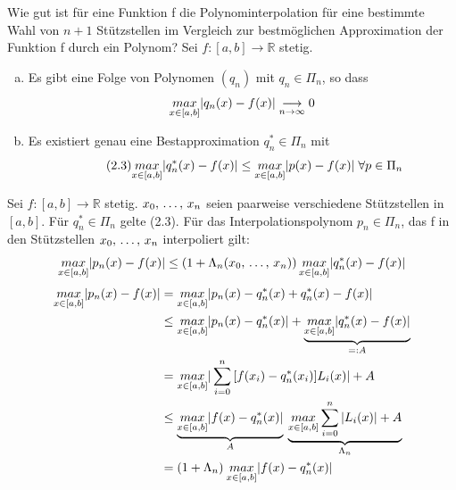 Wie gut ist für eine Funktion f die Polynominterpolation für eine bestimmte Wahl
von $n + 1$ Stützstellen im Vergleich zur bestmöglichen Approximation der Funktion f
durch ein Polynom?
 Sei $f:[a, b] \longrightarrow \mathbb{R}$ stetig.
\begin{enumerate}[(a)]
  \item Es gibt eine Folge von Polynomen $(q_n)$ mit $q_n \in \Pi_n$, so dass
    \begin{equation*}
      \underset{x \in [a, b]}{max} |q_n(x) - f(x)| \underset{n \to \infty}{\longrightarrow} 0
    \end{equation*}
  \item Es existiert genau eine Bestapproximation $q_n^* \in \Pi_n$ mit
    \begin{equation}
      \tag{2.3}
      \underset{x \in [a, b]}{max} |q_n^*(x) - f(x)| \leq \underset{x \in [a, b]}{max} |p(x) - f(x)| \; \forall p \in \Pi_n
    \end{equation}
\end{enumerate}
 Sei $f:[a, b] \longrightarrow \mathbb{R}$ stetig. $x_0,\,\ldots,\,x_n$
seien paarweise verschiedene Stützstellen in $[a, b]$. Für $q_n^* \in \Pi_n$ gelte
(2.3). Für das Interpolationspolynom $p_n \in \Pi_n$, das f in den Stützstellen
$x_0,\,\ldots,\,x_n$ interpoliert gilt:
\begin{equation*}
  \underset{x \in [a, b]}{max} |p_n(x) - f(x)| \leq (1 + \Lambda_n(x_0,\,\ldots,\,x_n))\,\underset{x \in [a, b]}{max} |q_n^*(x) - f(x)|
\end{equation*}
\begin{align*}
  \underset{x \in [a, b]}{max} |p_n(x) - f(x)| &= \underset{x \in [a, b]}{max} |p_n(x) - q_n^*(x) + q_n^*(x) - f(x)|\\
  &\leq \underset{x \in [a, b]}{max} |p_n(x) - q_n^*(x)| + \underbrace{\underset{x \in [a, b]}{max} |q_n^*(x) - f(x)|}_{=:A}\\
  &= \underset{x \in [a, b]}{max} |\sum\limits_{i=0}^{n}{[}f(x_i) - q_n^*(x_i)]L_i(x)| + A\\
  &\leq \underbrace{\underset{x \in [a, b]}{max} |f(x) - q_n^*(x)|}_A \: \underbrace{\underset{x \in [a, b]}{max} \sum\limits_{i=0}^{n}{|}L_i(x)| + A}_{\Lambda_n}\\
  &= (1 + \Lambda_n) \: \underset{x \in [a, b]}{max} |f(x) - q_n^*(x)|
\end{align*}
